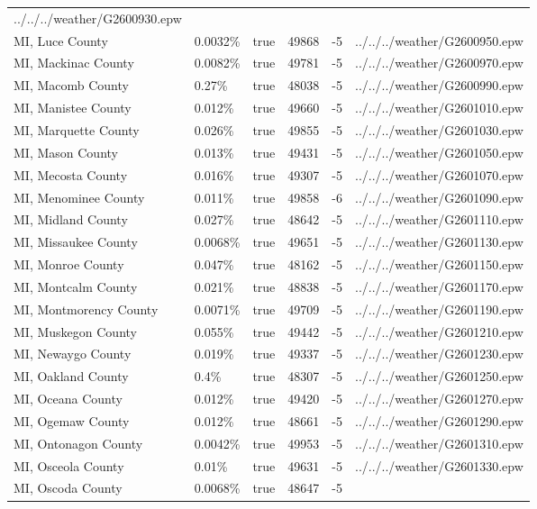 \begin{longtable}[]{@{}llllll@{}}
../../../weather/G2600930.epw \\
MI, Luce County & 0.0032\% & true & 49868 & -5 &
../../../weather/G2600950.epw \\
MI, Mackinac County & 0.0082\% & true & 49781 & -5 &
../../../weather/G2600970.epw \\
MI, Macomb County & 0.27\% & true & 48038 & -5 &
../../../weather/G2600990.epw \\
MI, Manistee County & 0.012\% & true & 49660 & -5 &
../../../weather/G2601010.epw \\
MI, Marquette County & 0.026\% & true & 49855 & -5 &
../../../weather/G2601030.epw \\
MI, Mason County & 0.013\% & true & 49431 & -5 &
../../../weather/G2601050.epw \\
MI, Mecosta County & 0.016\% & true & 49307 & -5 &
../../../weather/G2601070.epw \\
MI, Menominee County & 0.011\% & true & 49858 & -6 &
../../../weather/G2601090.epw \\
MI, Midland County & 0.027\% & true & 48642 & -5 &
../../../weather/G2601110.epw \\
MI, Missaukee County & 0.0068\% & true & 49651 & -5 &
../../../weather/G2601130.epw \\
MI, Monroe County & 0.047\% & true & 48162 & -5 &
../../../weather/G2601150.epw \\
MI, Montcalm County & 0.021\% & true & 48838 & -5 &
../../../weather/G2601170.epw \\
MI, Montmorency County & 0.0071\% & true & 49709 & -5 &
../../../weather/G2601190.epw \\
MI, Muskegon County & 0.055\% & true & 49442 & -5 &
../../../weather/G2601210.epw \\
MI, Newaygo County & 0.019\% & true & 49337 & -5 &
../../../weather/G2601230.epw \\
MI, Oakland County & 0.4\% & true & 48307 & -5 &
../../../weather/G2601250.epw \\
MI, Oceana County & 0.012\% & true & 49420 & -5 &
../../../weather/G2601270.epw \\
MI, Ogemaw County & 0.012\% & true & 48661 & -5 &
../../../weather/G2601290.epw \\
MI, Ontonagon County & 0.0042\% & true & 49953 & -5 &
../../../weather/G2601310.epw \\
MI, Osceola County & 0.01\% & true & 49631 & -5 &
../../../weather/G2601330.epw \\
MI, Oscoda County & 0.0068\% & true & 48647 & -5 &

\end{longtable}
